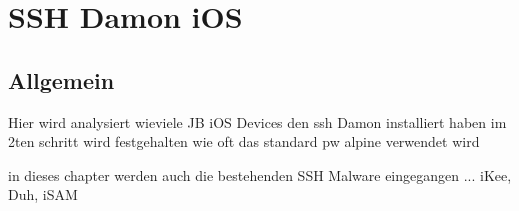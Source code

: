 %
%
%
% 

\chapter{SSH Damon iOS}
\label{ch:ssh}

\section{Allgemein}
\label{sec:InstallSSH}


Hier wird analysiert wieviele JB iOS Devices den ssh Damon installiert haben
im 2ten schritt wird festgehalten wie oft das standard pw alpine verwendet wird

in dieses chapter werden auch die bestehenden SSH Malware eingegangen ...
iKee, Duh, 
iSAM


